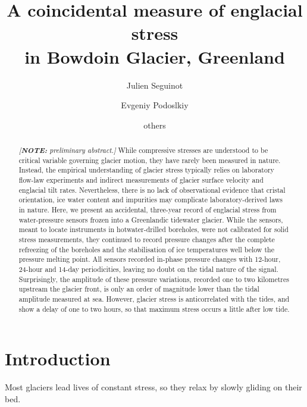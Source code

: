 \documentclass[utf8]{article}
\title{A coincidental measure of englacial stress \\
       in Bowdoin Glacier, Greenland}
\author[1]{Julien Seguinot}
\author[2]{Evgeniy Podoslkiy}
\author[ ]{others}
\affil[1]{Independent scholar, Anafi, Greece}
\affil[2]{Arctic Research Center, Hokkaido University, Sapporo, Japan}
\newcommand{\note}[1]{\textcolor{c0}{\emph{[\textbf{NOTE:} #1]}}}
\begin{document}

\maketitle

\begin{abstract}

    \note{preliminary abstract.}
    While compressive stresses are understood to be critical variable governing
    glacier motion, they have rarely been measured in nature. Instead, the
    empirical understanding of glacier stress typically relies on laboratory
    flow-law experiments and indirect measurements of glacier surface velocity
    and englacial tilt rates. Nevertheless, there is no lack of observational
    evidence that cristal orientation, ice water content and impurities may
    complicate laboratory-derived laws in nature.
    Here, we present an accidental, three-year record of englacial stress
    from water-pressure sensors frozen into a Greenlandic tidewater glacier.
    While the sensors, meant to locate instruments in hotwater-drilled
    boreholes, were not calibrated for solid stress measurements, they
    continued to record pressure changes after the complete refreezing of the
    boreholes and the stabilisation of ice temperatures well below the pressure
    melting point.
    All sensors recorded in-phase pressure changes with 12-hour, 24-hour and
    14-day periodicities, leaving no doubt on the tidal nature of the signal.
    Surprisingly, the amplitude of these pressure variations, recorded one to
    two kilometres upstream the glacier front, is only an order of magnitude
    lower than the tidal amplitude measured at sea. However, glacier stress is
    anticorrelated with the tides, and show a delay of one to two hours, so
    that maximum stress occurs a little after low tide.

\end{abstract}

\section{Introduction}

    Most glaciers lead lives of constant stress, so they relax by slowly
    gliding on their bed.
\end{document}
